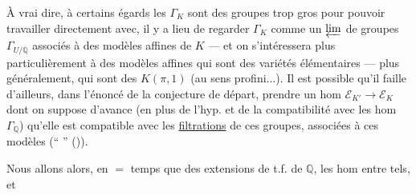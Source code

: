 À vrai dire, à certains égards les $\Gamma_K$ sont des groupes trop gros pour pouvoir travailler directement avec, il y a lieu de regarder $\Gamma_K$ comme un $\varprojlim$ de groupes $\Gamma_{U/\mathbb Q}$ associés à des modèles affines de $K$ --- et on s'intéressera plus particulièrement à des modèles affines qui sont des variétés élémentaires --- plus généralement, qui sont des $K(\pi,1)$ (au sens profini...). Il est possible qu'il faille d'ailleurs, dans l'énoncé de la conjecture de départ, prendre un hom  $\mathcal E_{K'}\longrightarrow\mathcal E_K$ dont on suppose d'avance (en plus de l'hyp.  et de la compatibilité avec les hom  $\Gamma_{\mathbb Q}$) qu'elle est compatible avec les \uline{filtrations} de ces groupes, associées à ces modèles (`` '' ()).

Nous allons alors, en $=$ temps que des extensions de t.f. de $\mathbb Q$, les hom entre tels, et

